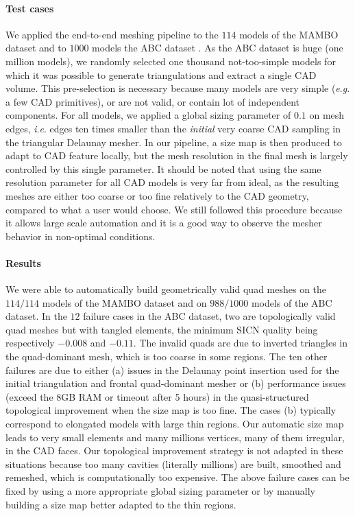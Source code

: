 \documentclass[AMA,STIX1COL]{WileyNJD-v2}
\newcommand{\ie}{\textit{i}.\textit{e}. }
\newcommand{\eg}{\textit{e}.\textit{g}. }
\begin{document}
{\paragraph{Test cases} We applied the end-to-end meshing pipeline to the $114$
models of the MAMBO dataset \cite{mambo} and to $1000$ models the ABC dataset
\cite{abc}. As the ABC dataset is huge (one million models), we randomly
selected one thousand not-too-simple models for which it was possible to generate triangulations and
extract a single CAD volume. This pre-selection is necessary because many
models are very simple (\eg a few CAD primitives), or are not valid, or contain lot of independent components.
For all models, we applied a global sizing parameter of $0.1$ on mesh
edges, \ie edges ten times smaller than the \emph{initial} very coarse CAD sampling
in the triangular Delaunay mesher.
In our pipeline, a size map is then produced to adapt to CAD feature locally,
but the mesh resolution in the final mesh is largely controlled by this single
parameter. It should be noted that using the same resolution parameter for 
all CAD models is very far from ideal, as the resulting meshes are either
too coarse or too fine relatively to the CAD geometry, compared to what
a user would choose. We still followed this procedure because it
allows large scale automation and it is a good way to observe the
mesher behavior in non-optimal conditions.

\paragraph{Results}
We were able to automatically build geometrically valid quad meshes on
the $114/114$ models of the MAMBO dataset and on $988/1000$ models of the ABC
dataset.  In the $12$ failure cases in the ABC dataset, two are topologically
valid quad meshes but with tangled elements, the minimum SICN quality being
respectively $-0.008$ and $-0.11$. The invalid quads are due to inverted
triangles in the quad-dominant mesh, which is too coarse in some regions. The
ten other failures are due to either (a) issues in the Delaunay point insertion
used for the initial triangulation and frontal quad-dominant mesher or 
(b) performance issues (exceed the 8GB RAM or timeout after 5 hours) in the quasi-structured topological improvement when
the size map is too fine.  The cases (b) typically correspond to elongated models with
large thin regions. Our automatic size map leads to very small elements and many
millions vertices, many of them irregular, in the CAD faces. Our topological
improvement strategy is not adapted in these situations because too many
cavities (literally millions) are built, smoothed and remeshed, which is
computationally too expensive. The above failure cases can be fixed by
using a more appropriate global sizing parameter or by manually building
a size map better adapted to the thin regions.

}
\end{document}
